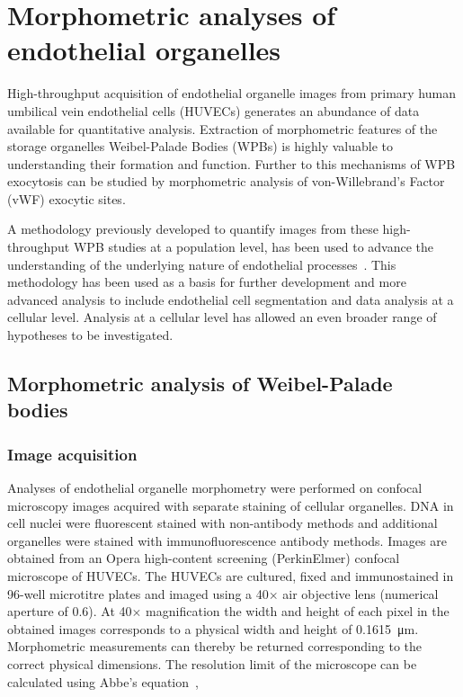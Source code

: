 \ifpdf
	\graphicspath{{chapter_2/figs/}}
\fi
\chapter{Morphometric analyses of endothelial organelles}
High-throughput acquisition of endothelial organelle images from primary human umbilical vein endothelial cells (HUVECs) generates an abundance of data available for quantitative analysis. Extraction of morphometric features of the storage organelles Weibel-Palade Bodies (WPBs) is highly valuable to understanding their formation and function. Further to this mechanisms of WPB exocytosis can be studied by morphometric analysis of von-Willebrand's Factor (vWF) exocytic sites.

A methodology previously developed to quantify images from these high-throughput WPB studies at a population level, has been used to advance the understanding of the underlying nature of endothelial processes~\cite{Ferraro2014,Stevenson2014}. This methodology has been used as a basis for further development and more advanced analysis to include endothelial cell segmentation and data analysis at a cellular level. Analysis at a cellular level has allowed an even broader range of hypotheses to be investigated.

\section{Morphometric analysis of Weibel-Palade bodies}
\subsection{Image acquisition}
Analyses of endothelial organelle morphometry were performed on confocal microscopy images acquired with separate staining of cellular organelles. DNA in cell nuclei were fluorescent stained with non-antibody methods and additional organelles were stained with immunofluorescence antibody methods. Images are obtained from an Opera high-content screening (PerkinElmer) confocal microscope of HUVECs. The HUVECs are cultured, fixed and immunostained in 96-well microtitre plates and imaged using a 40$\times$ air objective lens (numerical aperture of 0.6). At 40$\times$ magnification the width and height of each pixel in the obtained images corresponds to a physical width and height of \SI{0.1615}{\micro\meter}. Morphometric measurements can thereby be returned corresponding to the correct physical dimensions. The resolution limit of the microscope can be calculated using Abbe's equation~\cite{Abbe1873},

